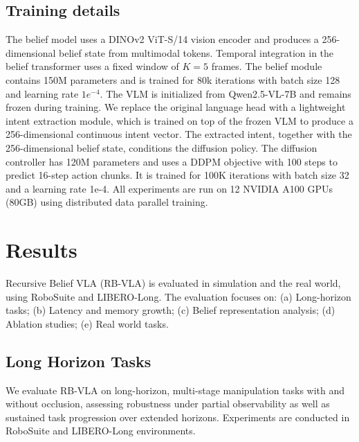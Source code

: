 \documentclass[conference]{IEEEtran}
\begin{document}
\subsection{Training details}
The belief model uses a DINOv2 ViT-S/14 vision encoder and produces a 256-dimensional belief state from multimodal tokens. Temporal integration in the belief transformer uses a fixed window of $K = 5$ frames. The belief module contains 150M parameters and is trained for 80k iterations with batch size 128 and learning rate $1e^{-4}$. The VLM is initialized from Qwen2.5-VL-7B \cite{bai2025qwen2} and remains frozen during training. We replace the original language head with a lightweight intent extraction module, which is trained on top of the frozen VLM to produce a 256-dimensional continuous intent vector. The extracted intent, together with the 256-dimensional belief state, conditions the diffusion policy. The diffusion controller has 120M parameters and uses a DDPM objective with 100 steps to predict 16-step action chunks. It is trained for 100K iterations with batch size 32 and a learning rate 1e-4. All experiments are run on 12 NVIDIA A100 GPUs (80GB) using distributed data parallel training.

\section{Results}
Recursive Belief VLA (RB-VLA) is evaluated in simulation and the real world, using RoboSuite and LIBERO-Long. The evaluation focuses on: (a) Long-horizon tasks; (b)  Latency and memory growth; (c) Belief representation analysis; (d) Ablation studies; (e) Real world tasks.
\subsection{Long Horizon Tasks}
We evaluate RB-VLA on long-horizon, multi-stage manipulation tasks with and without occlusion, assessing robustness under partial observability as well as sustained task progression over extended horizons. Experiments are conducted in RoboSuite and LIBERO-Long environments. 
\end{document}
